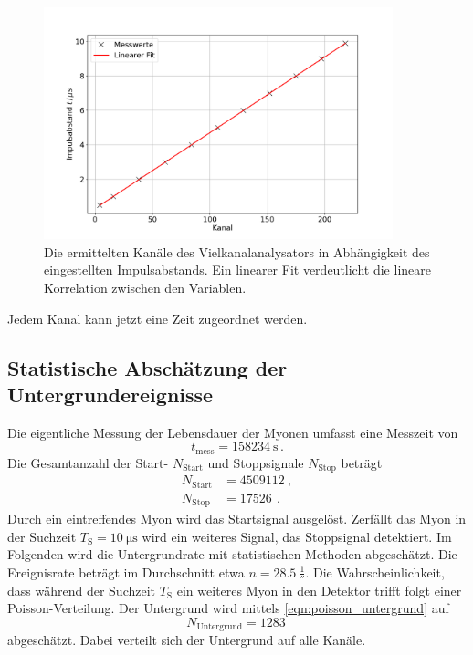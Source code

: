 \begin{figure}
    \centering
    \includegraphics[width=0.9\textwidth]{content/plots/calibration.pdf}
    \caption{Die ermittelten Kanäle des Vielkanalanalysators in Abhängigkeit des eingestellten Impulsabstands.
    Ein linearer Fit verdeutlicht die lineare Korrelation zwischen den Variablen.
    }
    \label{fig:kalibration}
\end{figure}
Jedem Kanal kann jetzt eine Zeit zugeordnet werden.
\FloatBarrier

\subsection{Statistische Abschätzung der Untergrundereignisse}
\label{sec:untergrund}
Die eigentliche Messung der Lebensdauer der Myonen umfasst eine Messzeit von
\begin{equation*}
    t_\text{mess} = \qty{158234}{\second} \,.
\end{equation*}
Die Gesamtanzahl der Start- $N_\text{Start}$ und Stoppsignale $N_\text{Stop}$ beträgt
\begin{align*}
    N_\text{Start} &= \qty{4509112}{}, \\
    N_\text{Stop} &= \qty{17526}{} \,.
\end{align*}
Durch ein eintreffendes Myon wird das Startsignal ausgelöst.
Zerfällt das Myon in der Suchzeit $T_\text{S} = \qty{10}{\micro\second}$ wird ein weiteres Signal, das Stoppsignal detektiert.
Im Folgenden wird die Untergrundrate mit statistischen Methoden abgeschätzt.
Die Ereignisrate beträgt im Durchschnitt etwa $n = \qty{28.5}{\frac{1}{\second}}$.
Die Wahrscheinlichkeit, dass während der Suchzeit $T_\text{S}$ ein weiteres Myon in den Detektor trifft folgt einer Poisson-Verteilung.  
Der Untergrund wird mittels \autoref{eqn:poisson_untergrund} auf
\begin{equation}
    N_\text{Untergrund} = \qty{1283}{}
    \label{eqn:untergrund}
\end{equation}
abgeschätzt.
Dabei verteilt sich der Untergrund auf alle Kanäle.
\FloatBarrier

